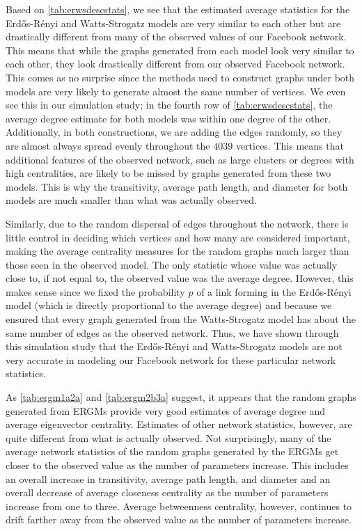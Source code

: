 \documentclass[12pt,twoside]{amherstthesis}
\begin{document}
  Based on \autoref{tab:erwsdescstats}, we see that the estimated average
  statistics for the Erdős-Rényi and Watts-Strogatz models are very
  similar to each other but are drastically different from many of the
  observed values of our Facebook network. This means that while the
  graphs generated from each model look very similar to each other, they
  look drastically different from our observed Facebook network. This
  comes as no surprise since the methods used to construct graphs under
  both models are very likely to generate almost the same number of
  vertices. We even see this in our simulation study; in the fourth row of
  \autoref{tab:erwsdescstats}, the average degree estimate for both models
  was within one degree of the other. Additionally, in both constructions,
  we are adding the edges randomly, so they are almost always spread
  evenly throughout the \(4039\) vertices. This means that additional
  features of the observed network, such as large clusters or degrees with
  high centralities, are likely to be missed by graphs generated from
  these two models. This is why the transitivity, average path length, and
  diameter for both models are much smaller than what was actually
  observed.
  
  Similarly, due to the random dispersal of edges throughout the network,
  there is little control in deciding which vertices and how many are
  considered important, making the average centrality measures for the
  random graphs much larger than those seen in the observed model. The
  only statistic whose value was actually close to, if not equal to, the
  observed value was the average degree. However, this makes sense since
  we fixed the probability \(p\) of a link forming in the Erdős-Rényi
  model (which is directly proportional to the average degree) and because
  we ensured that every graph generated from the Watts-Strogatz model has
  about the same number of edges as the observed network. Thus, we have
  shown through this simulation study that the Erdős-Rényi and
  Watts-Strogatz models are not very accurate in modeling our Facebook
  network for these particular network statistics.
  
  As \autoref{tab:ergm1a2a} and \autoref{tab:ergm2b3a} suggest, it appears
  that the random graphs generated from ERGMs provide very good estimates
  of average degree and average eigenvector centrality. Estimates of other
  network statistics, however, are quite different from what is actually
  observed. Not surprisingly, many of the average network statistics of
  the random graphs generated by the ERGMs get closer to the observed
  value as the number of parameters increase. This includes an overall
  increase in transitivity, average path length, and diameter and an
  overall decrease of average closeness centrality as the number of
  parameters increase from one to three. Average betweenness centrality,
  however, continues to drift farther away from the observed value as the
  number of parameters increase.
  
\end{document}
